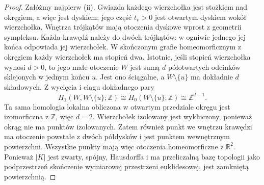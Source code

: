 \begin{proof}
Załóżmy najpierw (ii). Gwiazda każdego wierzchołka jest
stożkiem nad okręgiem, a więc jest dyskiem; jego część
$t_v>0$ jest otwartym dyskiem wokół wierzchołka. Wnętrza trójkątów
mają otoczenia dyskowe wprost z geometrii sympleksu.
Każda krawędź należy do dwóch trójkątów: w ogniwie jednego
jej końca odpowiada jej wierzchołek. W skończonym grafie
homeomorficznym z okręgiem każdy wierzchołek ma stopień
dwa. Istotnie, jeśli stopień wierzchołka wynosi $d>0$,
to jego małe otoczenie $W$ jest sumą $d$ półotwartych
odcinków sklejonych w jednym końcu $u$. Jest ono ściągalne,
a $W\setminus\{u\}$ ma dokładnie $d$ składowych.
Z wycięcia i ciągu dokładnego pary
\[
H_1(W,W\setminus\{u\};\mathbb Z)
\cong\widetilde H_0(W\setminus\{u\};\mathbb Z)
\cong\mathbb Z^{d-1}.
\]
Ta sama homologia lokalna obliczona w otwartym
przedziale okręgu jest izomorficzna z $\mathbb Z$,
więc $d=2$. Wierzchołek izolowany jest wykluczony,
ponieważ okrąg nie ma punktów izolowanych. Zatem również punkt we wnętrzu
krawędzi ma otoczenie powstałe z dwóch półdysków i jest
punktem wewnętrznym powierzchni. Wszystkie punkty mają
więc otoczenia homeomorficzne z $\mathbb R^2$. Ponieważ
$|K|$ jest zwarty, spójny, Hausdorffa i ma przeliczalną
bazę topologii jako podprzestrzeń skończenie wymiarowej
przestrzeni euklidesowej, jest zamkniętą powierzchnią.


\end{proof}

